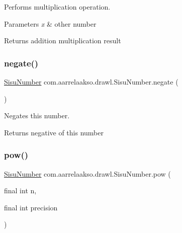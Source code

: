 Performs multiplication operation. 


\begin{DoxyParams}{Parameters}
{\em x} & other number \\
\hline
\end{DoxyParams}
\begin{DoxyReturn}{Returns}
addition multiplication result 
\end{DoxyReturn}
\mbox{\label{classcom_1_1aarrelaakso_1_1drawl_1_1_sisu_number_a2386c00d733c84ee7c97ae11d7d05ea8}} 
\subsubsection{\texorpdfstring{negate()}{negate()}}
{\footnotesize\ttfamily \hyperlink{classcom_1_1aarrelaakso_1_1drawl_1_1_sisu_number}{Sisu\+Number} com.\+aarrelaakso.\+drawl.\+Sisu\+Number.\+negate (\begin{DoxyParamCaption}{ }\end{DoxyParamCaption})\hspace{0.3cm}{\ttfamily [protected]}}



Negates this number. 

\begin{DoxyReturn}{Returns}
negative of this number 
\end{DoxyReturn}
\mbox{\label{classcom_1_1aarrelaakso_1_1drawl_1_1_sisu_number_a72dee08eae0e9522da081b0c67481b44}} 
\subsubsection{\texorpdfstring{pow()}{pow()}}
{\footnotesize\ttfamily \hyperlink{classcom_1_1aarrelaakso_1_1drawl_1_1_sisu_number}{Sisu\+Number} com.\+aarrelaakso.\+drawl.\+Sisu\+Number.\+pow (\begin{DoxyParamCaption}\item[{final int}]{n,  }\item[{final int}]{precision }\end{DoxyParamCaption})\hspace{0.3cm}{\ttfamily [protected]}}



